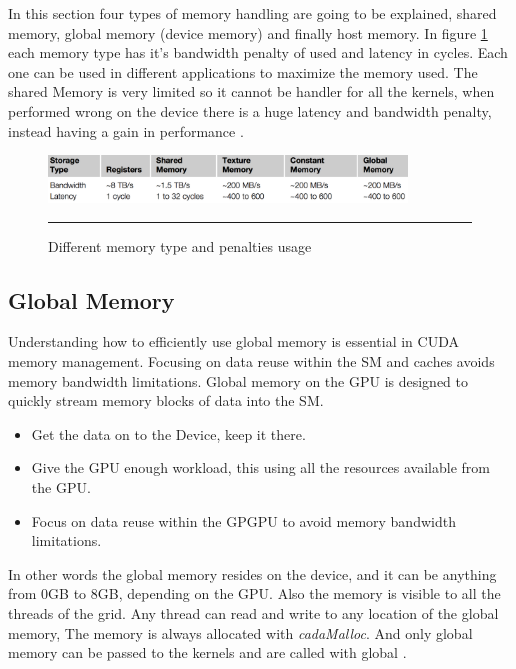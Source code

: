 In this section four types of memory handling are going to be explained, shared memory, global memory (device memory) and finally host memory. In figure \ref{fig:memory} each memory type has it's bandwidth penalty of used and latency in cycles. Each one can be used in different applications to maximize the memory used. The shared Memory is very limited so it cannot be handler for all the kernels, when performed wrong on the device there is a huge latency and bandwidth penalty, instead having a gain in performance \cite{cook}.

\begin{figure}[htbp]
	\centering
		\includegraphics[width=0.85\textwidth]{Figures/memory.png}
		\rule{35em}{0.5pt}
	\caption[Different memory types]{Different memory type and penalties usage}
	\label{fig:memory}
\end{figure}


\subsection{Global Memory}

Understanding how to efficiently use global memory is essential in CUDA memory management.
Focusing on data reuse within the SM and caches avoids memory bandwidth limitations. Global memory on the GPU is designed to quickly stream memory blocks of data into the SM.

\begin{itemize}
\item Get the data on to the Device, keep it there.
\item Give the GPU enough workload, this using all the resources available from the GPU.
\item Focus on data reuse within the GPGPU to avoid memory bandwidth limitations.
\end{itemize}

In other words the global memory resides on the device, and it can be anything from 0GB to 8GB, depending on the GPU. Also the memory is visible to all the threads of the grid. Any thread can read and write to any location of the global memory, The memory is always allocated with \textit{cadaMalloc}. And only global memory can be passed to the kernels and are called with \twoline global \twoline.


\cite{design}

